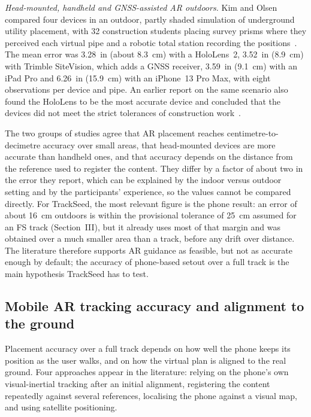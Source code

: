 \textit{Head-mounted, handheld and GNSS-assisted AR outdoors.} Kim and Olsen compared four devices in an outdoor, partly shaded simulation of underground utility placement, with 32 construction students placing survey prisms where they perceived each virtual pipe and a robotic total station recording the positions~\cite{kim2025isarc}. The mean error was 3.28~in (about 8.3~cm) with a HoloLens~2, 3.52~in (8.9~cm) with Trimble SiteVision, which adds a GNSS receiver, 3.59~in (9.1~cm) with an iPad Pro and 6.26~in (15.9~cm) with an iPhone~13 Pro Max, with eight observations per device and pipe. An earlier report on the same scenario also found the HoloLens to be the most accurate device and concluded that the devices did not meet the strict tolerances of construction work~\cite{kim2024ahfe}.

The two groups of studies agree that AR placement reaches centimetre-to-decimetre accuracy over small areas, that head-mounted devices are more accurate than handheld ones, and that accuracy depends on the distance from the reference used to register the content. They differ by a factor of about two in the error they report, which can be explained by the indoor versus outdoor setting and by the participants' experience, so the values cannot be compared directly. For TrackSeed, the most relevant figure is the phone result: an error of about 16~cm outdoors is within the provisional tolerance of 25~cm assumed for an FS track (Section~III), but it already uses most of that margin and was obtained over a much smaller area than a track, before any drift over distance. The literature therefore supports AR guidance as feasible, but not as accurate enough by default; the accuracy of phone-based setout over a full track is the main hypothesis TrackSeed has to test.

\subsection{Mobile AR tracking accuracy and alignment to the ground}
Placement accuracy over a full track depends on how well the phone keeps its position as the user walks, and on how the virtual plan is aligned to the real ground. Four approaches appear in the literature: relying on the phone's own visual-inertial tracking after an initial alignment, registering the content repeatedly against several references, localising the phone against a visual map, and using satellite positioning.

